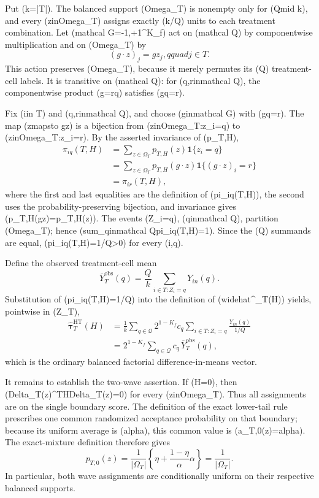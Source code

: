 Put (k=|T|).  The balanced support (Omega_T) is nonempty only for (Qmid k), and every (zinOmega_T) assigns exactly (k/Q) units to each treatment combination.  Let (mathcal G={-1,+1}^{K_f}) act on (mathcal Q) by componentwise multiplication and on (Omega_T) by
\[
(g\cdot z)_j=g z_j,qquad j\in T.
\]
This action preserves (Omega_T), because it merely permutes its (Q) treatment-cell labels.  It is transitive on (mathcal Q): for (q,rinmathcal Q), the componentwise product (g=rq) satisfies (gq=r).

Fix (iin T) and (q,rinmathcal Q), and choose (ginmathcal G) with (gq=r).  The map (zmapsto g\cdot z) is a bijection from ({zinOmega_T:z_i=q}) to ({zinOmega_T:z_i=r}).  By the asserted invariance of (p_{T,H}),
\[
\begin{aligned}
\pi_{iq}(T,H)
&=\sum_{z\in\Omega_T}p_{T,H}(z)\mathbf 1\{z_i=q\}\\
&=\sum_{z\in\Omega_T}p_{T,H}(g\cdot z)\mathbf 1\{(g\cdot z)_i=r\}\\
&=\pi_{ir}(T,H),
\end{aligned}
\]
where the first and last equalities are the definition of (pi_{iq}(T,H)), the second uses the probability-preserving bijection, and invariance gives (p_{T,H}(g\cdot z)=p_{T,H}(z)).  The events ({Z_i=q}), (qinmathcal Q), partition (Omega_T); hence (sum_{qinmathcal Q}pi_{iq}(T,H)=1).  Since the (Q) summands are equal, (pi_{iq}(T,H)=1/Q>0) for every (i,q).

Define the observed treatment-cell mean
\[
\overline Y_T^{\mathrm{obs}}(q)=\frac{Q}{k}\sum_{i\in T:Z_i=q}Y_{in}(q).
\]
Substitution of (pi_{iq}(T,H)=1/Q) into the definition of (widehat{\boldsymbol\tau}^{}_T(H)) yields, pointwise in (Z_T),
\[
\begin{aligned}
\widehat{\boldsymbol\tau}^{\mathrm{HT}}_T(H)
&=\frac1k\sum_{q\in\mathcal Q}2^{1-K_f}c_q
       \sum_{i\in T:Z_i=q}\frac{Y_{in}(q)}{1/Q}\\
&=2^{1-K_f}\sum_{q\in\mathcal Q}c_q\,
       \overline Y_T^{\mathrm{obs}}(q),
\end{aligned}
\]
which is the ordinary balanced factorial difference-in-means vector.

It remains to establish the two-wave assertion.  If (H=0), then (Delta_T(z)^{\mathsf T}HDelta_T(z)=0) for every (zinOmega_T).  Thus all assignments are on the single boundary score.  The definition of the exact lower-tail rule prescribes one common randomized acceptance probability on that boundary; because its uniform average is (alpha), this common value is (a_{T,0}(z)=alpha).  The exact-mixture definition therefore gives
\[
p_{T,0}(z)=\frac1{|\Omega_T|}
\left\{\eta+\frac{1-\eta}{\alpha}\alpha\right\}
=\frac1{|\Omega_T|}.
\]
In particular, both wave assignments are conditionally uniform on their respective balanced supports.

